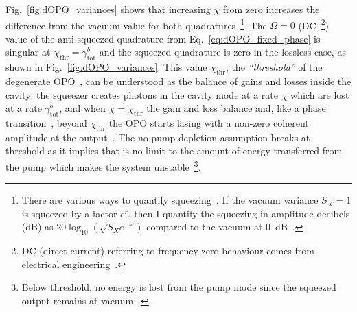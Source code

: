 Fig.~\ref{fig:dOPO_variances} shows that increasing $\chi$ from zero increases the difference from the vacuum value for both quadratures~\footnote{There are various ways to quantify squeezing~\cite{}. If the vacuum variance $S_X=1$ is squeezed by a factor $e^r$, then I quantify the squeezing in amplitude-decibels (dB) as $20 \log_{10}(\sqrt{S_X e^{-r}})$ compared to the vacuum at 0~dB~\cite{}.}. %
The $\Omega=0$ (DC~\footnote{DC (direct current) referring to frequency zero behaviour comes from electrical engineering~\cite{}.}) value of the anti-squeezed quadrature from Eq.~\ref{eq:dOPO_fixed_phase} is singular at $\chi_\text{thr}=\gamma^b_\text{tot}$ and the squeezed quadrature is zero in the lossless case, as shown in Fig.~\ref{fig:dOPO_variances}. %
This value $\chi_\text{thr}$, the \emph{``threshold''} of the degenerate OPO~\cite{}, %
can be understood as the balance of gains and losses inside the cavity: the squeezer creates photons in the cavity mode at a rate $\chi$ which are lost at a rate $\gamma^b_\text{tot}$, and when $\chi=\chi_\text{thr}$ the gain and loss balance and, like a phase transition~\cite{}, beyond $\chi_\text{thr}$ the OPO starts lasing with a non-zero coherent amplitude at the output~\cite{}. %
The no-pump-depletion assumption breaks at threshold as it implies that is no limit to the amount of energy transferred from the pump which makes the system unstable~\footnote{Below threshold, no energy is lost from the pump mode since the squeezed output remains at vacuum~\cite{}.}. 
